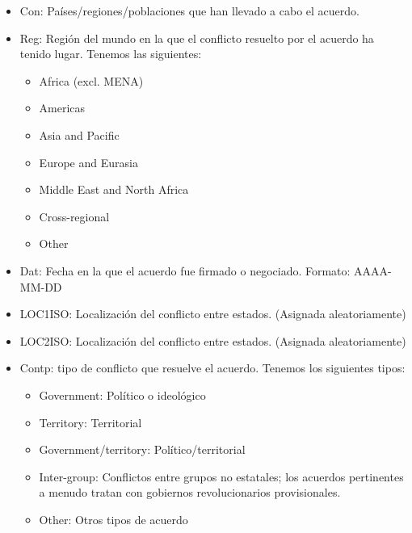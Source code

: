 \documentclass[11pt]{article}
\begin{document}
\begin{itemize}
    \item Con: Países/regiones/poblaciones que han llevado a cabo el acuerdo.
    
    \item Reg: Región del mundo en la que el conflicto resuelto por el acuerdo ha tenido lugar. Tenemos las siguientes:
   \begin{itemize}
   \item Africa (excl. MENA)
   
   \item Americas

   \item Asia and Pacific

   \item Europe and Eurasia

   \item Middle East and North Africa

   \item Cross-regional

   \item Other
   \end{itemize}
   
   \item Dat: Fecha en la que el acuerdo fue firmado o negociado. Formato: AAAA-MM-DD

    \item LOC1ISO: Localización del conflicto entre estados. (Asignada aleatoriamente) 
    
    \item LOC2ISO: Localización del conflicto entre estados. (Asignada aleatoriamente) 

    \item Contp: tipo de conflicto que resuelve el acuerdo. Tenemos los siguientes tipos:
     \begin{itemize}
   \item Government: Político o ideológico

   \item Territory: Territorial

   \item Government/territory: Político/territorial

   \item Inter-group: Conflictos entre grupos no estatales; los acuerdos pertinentes a menudo tratan con gobiernos revolucionarios provisionales.

   \item Other: Otros tipos de acuerdo
   \end{itemize}


\end{itemize}
\end{document}
